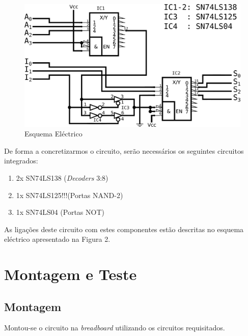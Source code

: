 \documentclass[a4paper,12pt]{article}
\begin{document}
\begin{figure}
\centering
\includegraphics[scale=.1]{esqelect.eps}
\caption{Esquema Eléctrico}
\end{figure}
\par

De forma a concretizarmos o circuito, serão necessários os seguintes 
circuitos integrados:
\begin{enumerate}
    \item 2x SN74LS138 ({\it Decoders} 3:8)
    \item 1x SN74LS125!!!(Portas NAND-2)
    \item 1x SN74LS04  (Portas NOT)
\end{enumerate}
\par
As ligações deste circuito com estes componentes estão descritas no esquema 
eléctrico apresentado na Figura 2.
\section{Montagem e Teste}
\subsection{Montagem}
Montou-se o circuito na {\it breadboard} utilizando os circuitos requisitados.

\pagebreak
\end{document}
